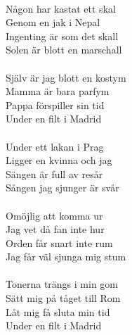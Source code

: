 \\
Någon har kastat ett skal\\
Genom en jak i Nepal\\
Ingenting är som det skall\\
Solen är blott en marschall\\
\\
Själv är jag blott en kostym\\
Mamma är bara parfym\\
Pappa förspiller sin tid\\
Under en filt i Madrid\\
\\
Under ett lakan i Prag\\
Ligger en kvinna och jag\\
Sängen är full av resår\\
Sången jag sjunger är svår\\
\\
Omöjlig att komma ur\\
Jag vet då fan inte hur\\
Orden får snart inte rum\\
Jag får väl sjunga mig stum\\
\\
Tonerna trängs i min gom\\
Sätt mig på tåget till Rom\\
Låt mig få sluta min tid\\
Under en filt i Madrid\\

